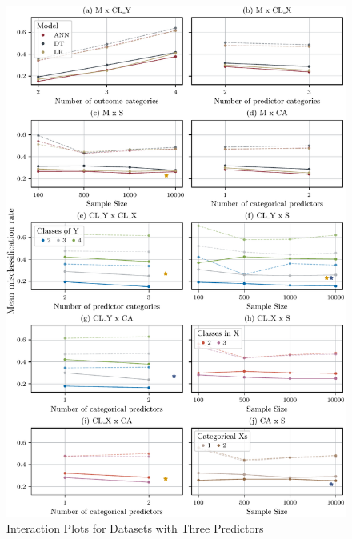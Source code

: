 \documentclass[12pt]{article}
\begin{document}
\begin{figure}[h]
    \centering
    \includegraphics{fig/06_08_Interactions_V3.pdf}
    \caption{Interaction Plots for Datasets with Three Predictors}
    \label{fig:06_08_Interactions_V3}
\end{figure}
\end{document}

